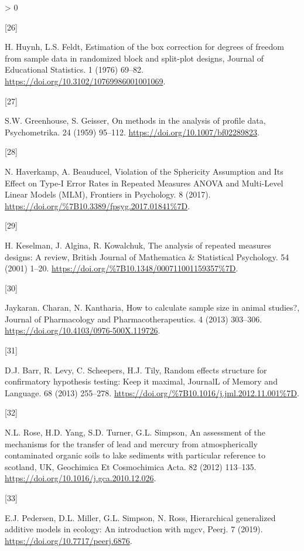 \documentclass[
]{article}
\newlength{\cslhangindent}
\newlength{\csllabelwidth}
\newenvironment{CSLReferences}[2] %
 {%
  \setlength{\parindent}{0pt}
  \ifodd #1 \everypar{\setlength{\hangindent}{\cslhangindent}}\ignorespaces\fi
  \ifnum #2 > 0
  \setlength{\parskip}{#2\baselineskip}
  \fi
 }%
 {}
\newcommand{\CSLLeftMargin}[1]{\parbox[t]{\csllabelwidth}{#1}}
\newcommand{\CSLRightInline}[1]{\parbox[t]{\linewidth - \csllabelwidth}{#1}\break}
\begin{document}
\begin{CSLReferences}{0}{0}
\leavevmode\hypertarget{ref-huynh1976}{}%
\CSLLeftMargin{{[}26{]} }
\CSLRightInline{H. Huynh, L.S. Feldt, Estimation of the box correction for degrees of freedom from sample data in randomized block and split-plot designs, Journal of Educational Statistics. 1 (1976) 69--82. \url{https://doi.org/10.3102/10769986001001069}.}

\leavevmode\hypertarget{ref-greenhouse1959}{}%
\CSLLeftMargin{{[}27{]} }
\CSLRightInline{S.W. Greenhouse, S. Geisser, On methods in the analysis of profile data, Psychometrika. 24 (1959) 95--112. \url{https://doi.org/10.1007/bf02289823}.}

\leavevmode\hypertarget{ref-haverkamp2017}{}%
\CSLLeftMargin{{[}28{]} }
\CSLRightInline{N. Haverkamp, A. Beauducel, {Violation of the Sphericity Assumption and Its Effect on Type-I Error Rates in Repeated Measures ANOVA and Multi-Level Linear Models (MLM)}, {Frontiers in Psychology}. {8} (2017). \url{https://doi.org/\%7B10.3389/fpsyg.2017.01841\%7D}.}

\leavevmode\hypertarget{ref-keselman2001}{}%
\CSLLeftMargin{{[}29{]} }
\CSLRightInline{H. Keselman, J. Algina, R. Kowalchuk, {The analysis of repeated measures designs: A review}, {British Journal of Mathematica \& Statistical Psychology}. {54} (2001) 1--20. \url{https://doi.org/\%7B10.1348/000711001159357\%7D}.}

\leavevmode\hypertarget{ref-charan2013}{}%
\CSLLeftMargin{{[}30{]} }
\CSLRightInline{Jaykaran. Charan, N. Kantharia, {How to calculate sample size in animal studies?}, Journal of Pharmacology and Pharmacotherapeutics. 4 (2013) 303--306. \url{https://doi.org/10.4103/0976-500X.119726}.}

\leavevmode\hypertarget{ref-barr2013}{}%
\CSLLeftMargin{{[}31{]} }
\CSLRightInline{D.J. Barr, R. Levy, C. Scheepers, H.J. Tily, {Random effects structure for confirmatory hypothesis testing: Keep it maximal}, {JournalL of Memory and Language}. {68} (2013) 255--278. \url{https://doi.org/\%7B10.1016/j.jml.2012.11.001\%7D}.}

\leavevmode\hypertarget{ref-rose2012}{}%
\CSLLeftMargin{{[}32{]} }
\CSLRightInline{N.L. Rose, H.D. Yang, S.D. Turner, G.L. Simpson, An assessment of the mechanisms for the transfer of lead and mercury from atmospherically contaminated organic soils to lake sediments with particular reference to scotland, UK, Geochimica Et Cosmochimica Acta. 82 (2012) 113--135. \url{https://doi.org/10.1016/j.gca.2010.12.026}.}

\leavevmode\hypertarget{ref-pedersen2019}{}%
\CSLLeftMargin{{[}33{]} }
\CSLRightInline{E.J. Pedersen, D.L. Miller, G.L. Simpson, N. Ross, Hierarchical generalized additive models in ecology: An introduction with mgcv, Peerj. 7 (2019). \url{https://doi.org/10.7717/peerj.6876}.}


\end{CSLReferences}
\end{document}
